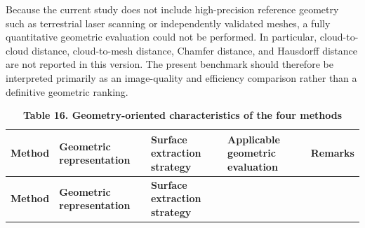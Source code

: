 Because the current study does not include high-precision reference
geometry such as terrestrial laser scanning or independently validated
meshes, a fully quantitative geometric evaluation could not be
performed. In particular, cloud-to-cloud distance, cloud-to-mesh
distance, Chamfer distance, and Hausdorff distance are not reported in
this version. The present benchmark should therefore be interpreted
primarily as an image-quality and efficiency comparison rather than a
definitive geometric ranking.

\begin{longtable}[]{@{}
  >{\centering\arraybackslash}p{}
  >{\centering\arraybackslash}p{}
  >{\centering\arraybackslash}p{}
  >{\centering\arraybackslash}p{}
  >{\centering\arraybackslash}p{}@{}}
\caption{\textbf{Table 16. Geometry-oriented characteristics of the
four methods}}\tabularnewline
\toprule\noalign{}
\begin{minipage}[b]{\linewidth}\centering
\textbf{Method}
\end{minipage} & \begin{minipage}[b]{\linewidth}\centering
\textbf{Geometric representation}
\end{minipage} & \begin{minipage}[b]{\linewidth}\centering
\textbf{Surface extraction strategy}
\end{minipage} & \begin{minipage}[b]{\linewidth}\centering
\textbf{Applicable geometric evaluation}
\end{minipage} & \begin{minipage}[b]{\linewidth}\centering
\textbf{Remarks}
\end{minipage} \\
\midrule\noalign{}
\endfirsthead
\toprule\noalign{}
\begin{minipage}[b]{\linewidth}\centering
\textbf{Method}
\end{minipage} & \begin{minipage}[b]{\linewidth}\centering
\textbf{Geometric representation}
\end{minipage} & \begin{minipage}[b]{\linewidth}\centering
\textbf{Surface extraction strategy}
\end{minipage} & \begin{minipage}[b]{\linewidth}\centering

\end{minipage}
\end{longtable}
